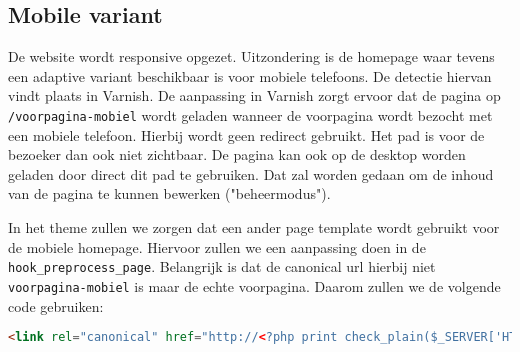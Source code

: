 \subsection{Mobile variant}\label{mobile}

De website wordt responsive opgezet. Uitzondering is de homepage waar tevens een adaptive variant beschikbaar is voor mobiele telefoons. De detectie hiervan vindt plaats in Varnish. De aanpassing in Varnish zorgt ervoor dat de pagina op \texttt{/voorpagina-mobiel} wordt geladen wanneer de voorpagina wordt bezocht met een mobiele telefoon. Hierbij wordt geen redirect gebruikt. Het pad is voor de bezoeker dan ook niet zichtbaar. De pagina kan ook op de desktop worden geladen door direct dit pad te gebruiken. Dat zal worden gedaan om de inhoud van de pagina te kunnen bewerken ("beheermodus").

In het theme zullen we zorgen dat een ander page template wordt gebruikt voor de mobiele homepage. Hiervoor zullen we een aanpassing doen in de \texttt{hook\_preprocess\_page}. Belangrijk is dat de canonical url hierbij niet \texttt{voorpagina-mobiel} is maar de echte voorpagina. Daarom zullen we de volgende code gebruiken:

\begin{lstlisting}[language=HTML]
<link rel="canonical" href="http://<?php print check_plain($_SERVER['HTTP_HOST']); ?>/" />
\end{lstlisting}
